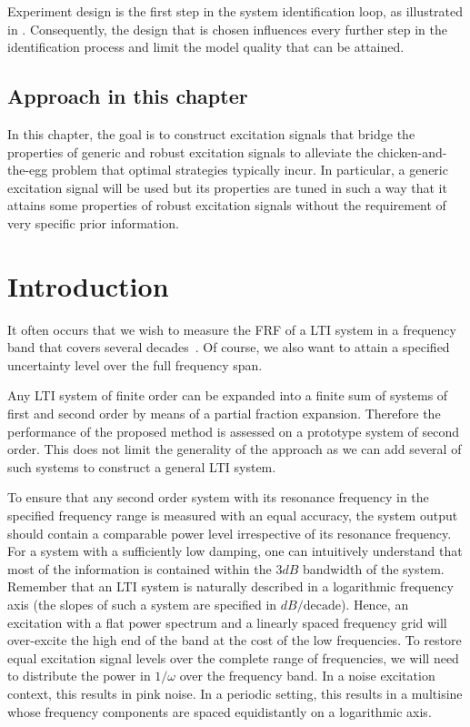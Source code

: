 Experiment design is the first step in the system identification loop, as illustrated in .
Consequently, the design that is chosen influences every further step in the identification process and limit the model quality that can be attained.

\subsection{Approach in this chapter}
\label{sec:excitation:intro:approach}
In this chapter, the goal is to construct excitation signals that bridge the properties of generic and robust excitation signals to alleviate the chicken-and-the-egg problem that optimal strategies typically incur.
In particular, a generic excitation signal will be used but its properties are tuned in such a way that it attains some properties of robust excitation signals without the requirement of very specific prior information. 





\section{Introduction}
  It often occurs that we wish to measure the \gls{FRF} of a \gls{LTI} system in a frequency band that covers several decades~\citep{Bragos2001,Sanchez2011,Niedostatkiewicz2009,VanGheem2004}.
  Of course, we also want to attain a specified uncertainty level over the full frequency span.

  Any \gls{LTI} system of finite order can be expanded into a  finite sum of systems of first and second order by means of a partial fraction expansion\citep{Oppenheim1983}.
  Therefore the performance of the proposed method is assessed on a prototype system of second order.
  This does not limit the generality of the approach as we can add several of such systems to construct a general \gls{LTI} system.
  
  To ensure that any second order system with its resonance frequency in the specified frequency range is measured with an equal accuracy, the system output should contain a comparable power level irrespective of its resonance frequency.
  For a system with a sufficiently low damping, one can intuitively understand that most of the information is contained within the $3 \unit{dB}$ bandwidth of the system.
  Remember that an \gls{LTI} system is naturally described in a logarithmic frequency axis (the slopes of such a system are specified in $\unit{dB}/\text{decade}$).
  Hence, an excitation with a flat power spectrum and a linearly spaced frequency grid will over-excite the high end of the band at the cost of the low frequencies.
  To restore equal excitation signal levels over the complete range of frequencies, we will need to distribute the power in $1/\omega$ over the frequency band.
  In a noise excitation context, this results in pink noise.
  In a periodic setting, this results in a multisine whose frequency components are spaced equidistantly on a logarithmic axis.
  
